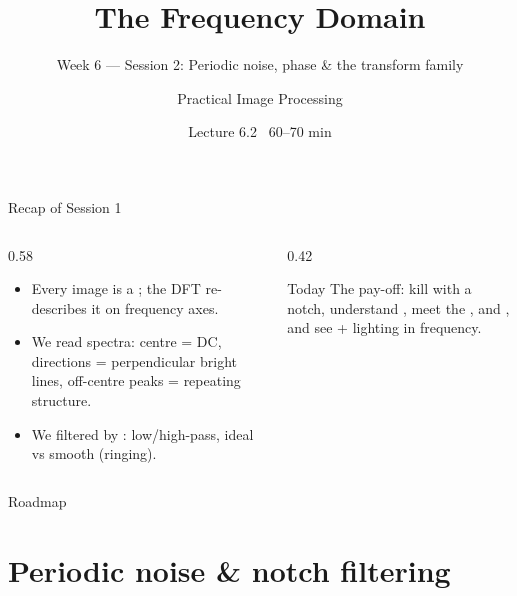 \documentclass[10pt,aspectratio=169]{beamer}
\title{The Frequency Domain}
\subtitle{Week 6 — Session 2: Periodic noise, phase \& the transform family}
\author{Practical Image Processing}
\date{Lecture 6.2 \textbullet\ 60--70 min}
\begin{document}
\maketitle

\begin{frame}{Recap of Session 1}
  \begin{columns}[T]
    \begin{column}{0.58\textwidth}
      \begin{itemize}
        \item Every image is a ; the DFT re-describes it on frequency axes.
        \item We read spectra: centre = DC, directions = perpendicular bright lines, off-centre
              peaks = repeating structure.
        \item We filtered by : low/high-pass, ideal vs smooth (ringing).
      \end{itemize}
    \end{column}
    \begin{column}{0.42\textwidth}
      \begin{alertblock}{Today}
        The pay-off: kill  with a notch, understand , meet the
        ,  and , and see  + lighting in frequency.
      \end{alertblock}
    \end{column}
  \end{columns}
\end{frame}

\begin{frame}{Roadmap}\tableofcontents\end{frame}

\section{Periodic noise \& notch filtering}
\end{document}
